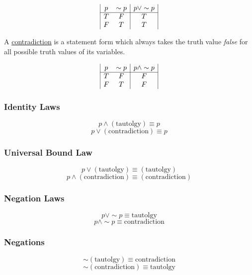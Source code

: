 \begin{example}
    $$\begin{array}{|c c|c|}
    p & \sim p & p\lor \sim p\\
    \hline
    T & F & T\\
    F & T & T
    \end{array}$$
\end{example}

\begin{definition}
    A \underline{contradiction} is a statement form which always takes the truth value \emph{false} for all possible truth values of its variables.
\end{definition}

\begin{example}
    $$\begin{array}{|c c|c|}
    p & \sim p & p\land \sim p\\
    \hline
    T & F & F\\
    F & T & F
    \end{array}$$
\end{example}

\begin{multicols}{2}
\subsubsection{Identity Laws}
$$p\land \left(\text{tautolgy}\right) \equiv p$$
$$p\lor \left(\text{contradiction}\right) \equiv p$$

\subsubsection{Universal Bound Law}
$$p\lor \left(\text{tautolgy}\right) \equiv \left(\text{tautolgy}\right)$$
$$p\land \left(\text{contradiction}\right) \equiv \left(\text{contradiction}\right)$$

\subsubsection{Negation Laws}
$$p\lor \sim p \equiv \text{tautolgy}$$
$$p\land \sim p \equiv \text{contradiction}$$

\subsubsection{Negations}
$$\sim \left(\text{tautolgy}\right) \equiv \text{contradiction}$$
$$\sim \left(\text{contradiction}\right) \equiv \text{tautolgy}$$
\end{multicols}


